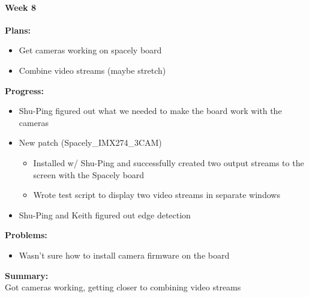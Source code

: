 \paragraph{Week 8}
\begin{adjustwidth}{2.5em}{0pt}
    \vspace{-0.5cm}\textbf{Plans:}
    \vspace{-0.5cm}
    \begin{itemize}
        \item Get cameras working on spacely board
        \item Combine video streams (maybe stretch)
    \end{itemize} 
    \vspace{-0.3cm}\textbf{Progress:}
    \vspace{-0.5cm}
    \begin{itemize}
        \item Shu-Ping figured out what we needed to make the board work with the cameras
        \item New patch (Spacely\_IMX274\_3CAM)
        \begin{itemize}
            \item Installed w/ Shu-Ping and successfully created two output streams to the screen with the Spacely board
            \item Wrote test script to display two video streams in separate windows
        \end{itemize}
        \item Shu-Ping and Keith figured out edge detection
    \end{itemize} 
    \vspace{-0.3cm}\textbf{Problems:}
    \vspace{-0.5cm}
    \begin{itemize}
        \item Wasn't sure how to install camera firmware on the board
    \end{itemize}  
    \vspace{-0.3cm}\noindent\textbf{Summary:}\\
    \noindent 
    Got cameras working, getting closer to combining video streams
\end{adjustwidth} 

